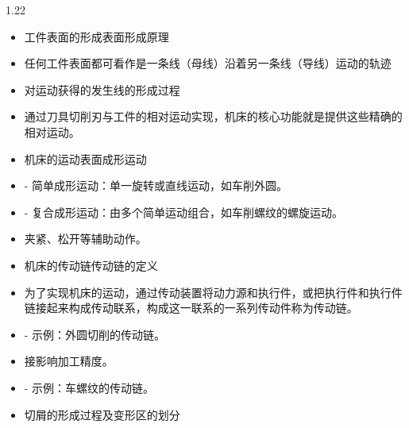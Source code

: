 \documentclass[12pt,a4paper]{article}
\begin{document}
\begin{spacing}{1.22}
\begin{itemize}[leftmargin=2.2em,label=--]
  \item 工件表面的形成表面形成原理
  \item 任何工件表面都可看作是一条线（母线）沿着另一条线（导线）运动的轨迹
  \item 对运动获得的发生线的形成过程
  \item 通过刀具切削刃与工件的相对运动实现，机床的核心功能就是提供这些精确的相对运动。
  \item 机床的运动表面成形运动
  \item - 简单成形运动：单一旋转或直线运动，如车削外圆。
  \item - 复合成形运动：由多个简单运动组合，如车削螺纹的螺旋运动。
  \item 夹紧、松开等辅助动作。
  \item 机床的传动链传动链的定义
  \item 为了实现机床的运动，通过传动装置将动力源和执行件，或把执行件和执行件链接起来构成传动联系，构成这一联系的一系列传动件称为传动链。
  \item - 示例：外圆切削的传动链。
  \item 接影响加工精度。
  \item - 示例：车螺纹的传动链。
  \item 切屑的形成过程及变形区的划分
\end{itemize}


\end{spacing}
\end{document}
